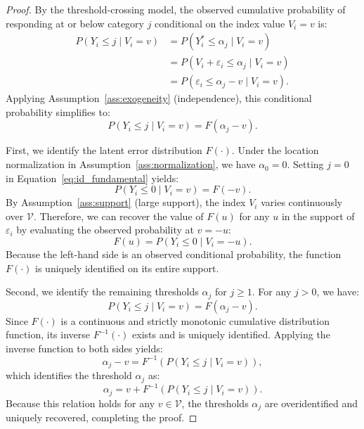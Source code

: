 \documentclass{article}
\numberwithin{figure}{section}
\numberwithin{table}{section}
\numberwithin{equation}{section}
\begin{document}
\begin{proof}
By the threshold-crossing model, the observed cumulative probability of responding at or below category $j$ conditional on the index value $V_i = v$ is:
\begin{align}
P(Y_i \le j \mid V_i = v) &= P(Y_i^* \le \alpha_j \mid V_i = v) \nonumber \\
&= P(V_i + \varepsilon_i \le \alpha_j \mid V_i = v) \nonumber \\
&= P(\varepsilon_i \le \alpha_j - v \mid V_i = v).
\end{align}
Applying Assumption~\ref{ass:exogeneity} (independence), this conditional probability simplifies to:
\begin{equation}
P(Y_i \le j \mid V_i = v) = F(\alpha_j - v).
\label{eq:id_fundamental}
\end{equation}

First, we identify the latent error distribution $F(\cdot)$. Under the location normalization in Assumption~\ref{ass:normalization}, we have $\alpha_0 = 0$. Setting $j = 0$ in Equation~\eqref{eq:id_fundamental} yields:
\begin{equation}
P(Y_i \le 0 \mid V_i = v) = F(-v).
\end{equation}
By Assumption~\ref{ass:support} (large support), the index $V_i$ varies continuously over $\mathcal{V}$. Therefore, we can recover the value of $F(u)$ for any $u$ in the support of $\varepsilon_i$ by evaluating the observed probability at $v = -u$:
\begin{equation}
F(u) = P(Y_i \le 0 \mid V_i = -u).
\end{equation}
Because the left-hand side is an observed conditional probability, the function $F(\cdot)$ is uniquely identified on its entire support.

Second, we identify the remaining thresholds $\alpha_j$ for $j \ge 1$. For any $j > 0$, we have:
\begin{equation}
P(Y_i \le j \mid V_i = v) = F(\alpha_j - v).
\end{equation}
Since $F(\cdot)$ is a continuous and strictly monotonic cumulative distribution function, its inverse $F^{-1}(\cdot)$ exists and is uniquely identified. Applying the inverse function to both sides yields:
\begin{equation}
\alpha_j - v = F^{-1}\left( P(Y_i \le j \mid V_i = v) \right),
\end{equation}
which identifies the threshold $\alpha_j$ as:
\begin{equation}
\alpha_j = v + F^{-1}\left( P(Y_i \le j \mid V_i = v) \right).
\end{equation}
Because this relation holds for any $v \in \mathcal{V}$, the thresholds $\alpha_j$ are overidentified and uniquely recovered, completing the proof.
\end{proof}
\end{document}
